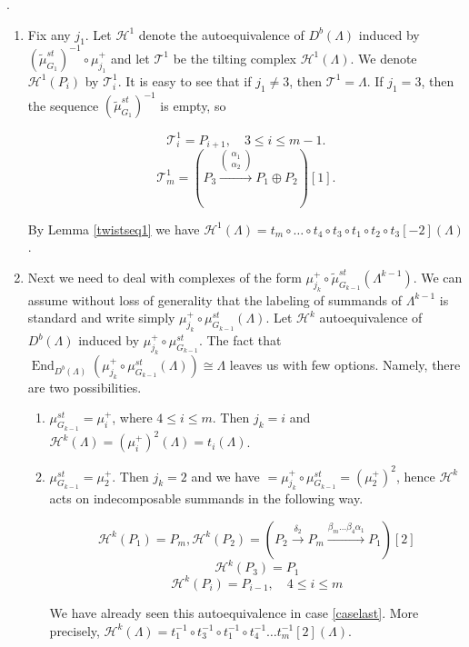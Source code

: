 \documentclass[12pt]{amsart}
\theoremstyle{plain}
\theoremstyle{remark}
\theoremstyle{definition}
\newcommand{\End}{\mathop{\mathrm{End}}\nolimits}
\begin{document}
.  

 \begin{enumerate}
     \item Fix any $j_1$. Let $\mathcal{H}^1$ denote the autoequivalence of $D^b(\Lambda)$  induced by $(\widetilde{\mu}_{G_1}^{st})^{-1} \circ \mu_{j_1}^+$ and let $\mathcal{T}^1$ be the tilting complex $\mathcal{H}^1(\Lambda)$. We denote $\mathcal{H}^1(P_i)$ by $\mathcal{T}_i^1$. It is easy to see that if $j_1 \neq 3$, then $\mathcal{T}^1 = \Lambda$. If $j_1 = 3$, then the sequence $(\widetilde{\mu}_{G_1}^{st})^{-1}$ is empty, so
     
     $$ \mathcal{T}_i^1 = P_{i+1}, \quad 3 \leq i \leq m-1. $$
     $$ \mathcal{T}_m^1 = (P_{3} \xrightarrow{\begin{pmatrix}\alpha_1 \\ \alpha_2 \end{pmatrix}} P_1 \oplus P_{2})[1]. $$
     
    By Lemma \ref{twistseq1} we have $\mathcal{H}^1(\Lambda) = t_m \circ \dots \circ t_4 \circ t_3 \circ t_1 \circ t_2 \circ t_3[-2](\Lambda)$. 
     
     \item Next we need to deal with complexes of the form $\mu_{j_k}^+ \circ \widetilde{\mu}_{G_{k-1}}^{st}(\Lambda^{k-1})$. We can assume without loss of generality that the labeling of summands of $\Lambda^{k-1}$ is standard and write simply $\mu_{j_k}^+ \circ \mu_{G_{k-1}}^{st}(\Lambda)$. Let $\mathcal{H}^k$ autoequivalence of $D^b(\Lambda)$ induced by $\mu_{j_k}^+ \circ \mu_{G_{k-1}}^{st}$. The fact that $\End_{D^b(\Lambda)}(\mu_{j_k}^+ \circ \mu_{G_{k-1}}^{st}(\Lambda)) \cong \Lambda$ leaves us with few options. Namely, there are two possibilities. 
     
     \begin{enumerate}
         \item $\mu_{G_{k-1}}^{st} = \mu_i^+$, where $4 \leq i \leq m$. Then $j_k = i$ and $\mathcal{H}^k(\Lambda) = (\mu_i^+)^2(\Lambda) = t_i(\Lambda)$.
         \item $\mu_{G_{k-1}}^{st} = \mu_2^+$. Then $j_k = 2$ and we have $ = \mu_{j_k}^+ \circ \mu_{G_{k-1}}^{st} = (\mu_2^+)^2$, hence $\mathcal{H}^k$ acts on indecomposable summands in the following way.
         
         $$\mathcal{H}^k(P_1) = P_m, \mathcal{H}^k(P_2) = (P_2 \xrightarrow{\delta_2} P_m \xrightarrow{\beta_m\dots\beta_4\alpha_1} P_1)[2] $$
         $$\mathcal{H}^k(P_3) = P_1$$ 
         $$\mathcal{H}^k(P_i) = P_{i-1}, \quad 4 \leq i \leq m$$
         
        We have already seen this autoequivalence in case \ref{caselast}. More precisely, ${\mathcal{H}^k(\Lambda) = t_1^{-1} \circ t_3^{-1} \circ t_1^{-1} \circ t_4^{-1} \dots t_m^{-1}[2](\Lambda)}$. 
        
     \end{enumerate}
     
     
 \end{enumerate}
 
\end{document}
